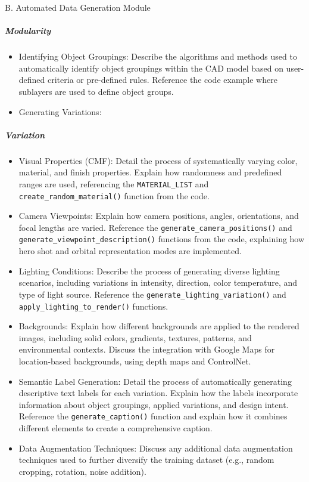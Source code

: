 \documentclass{article}
\begin{document}
B. Automated Data Generation Module
\subparagraph{Modularity}
\begin{itemize}
    \item Identifying Object Groupings: Describe the algorithms and methods used to automatically identify object groupings within the CAD model based on user-defined criteria or pre-defined rules. Reference the code example where sublayers are used to define object groups.
    \item Generating Variations:
\end{itemize}
\subparagraph{Variation}
\begin{itemize}
    \item Visual Properties (CMF): Detail the process of systematically varying color, material, and finish properties. Explain how randomness and predefined ranges are used, referencing the \texttt{MATERIAL\_LIST} and \texttt{create\_random\_material()} function from the code.
    \item Camera Viewpoints: Explain how camera positions, angles, orientations, and focal lengths are varied. Reference the \texttt{generate\_camera\_positions()} and \texttt{generate\_viewpoint\_description()} functions from the code, explaining how hero shot and orbital representation modes are implemented.
    \item Lighting Conditions: Describe the process of generating diverse lighting scenarios, including variations in intensity, direction, color temperature, and type of light source. Reference the \texttt{generate\_lighting\_variation()} and \texttt{apply\_lighting\_to\_render()} functions.
    \item Backgrounds: Explain how different backgrounds are applied to the rendered images, including solid colors, gradients, textures, patterns, and environmental contexts. Discuss the integration with Google Maps for location-based backgrounds, using depth maps and ControlNet.
    \item Semantic Label Generation: Detail the process of automatically generating descriptive text labels for each variation. Explain how the labels incorporate information about object groupings, applied variations, and design intent. Reference the \texttt{generate\_caption()} function and explain how it combines different elements to create a comprehensive caption.
    \item Data Augmentation Techniques: Discuss any additional data augmentation techniques used to further diversify the training dataset (e.g., random cropping, rotation, noise addition).
\end{itemize}
\end{document}
